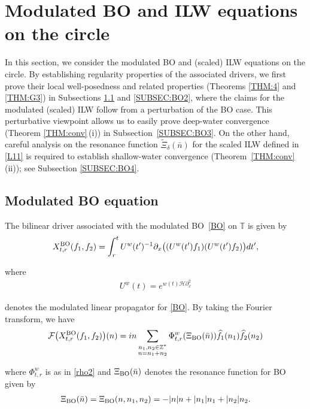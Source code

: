 \documentclass[letterpaper, 11pt,  reqno]{amsart}
\newcommand{\1}{\hspace{0.5mm}\text{I}\hspace{0.5mm}}
\newcommand{\noi}{\noindent}
\newcommand{\Z}{\mathbb{Z}}
\newcommand{\T}{\mathbb{T}}
\renewcommand{\H}{\mathcal{H}}
\newcommand{\F}{\mathcal{F}}
\newcommand{\dl}{\delta}
\newcommand{\ft}{\widehat}
\newcommand{\wt}{\widetilde}
\newcommand{\dx}{\partial_x}
\newcommand{\uw}{U^w}
\newcommand{\sub}{\substack}
\newcommand{\BO}{\text{\rm BO} }
\numberwithin{equation}{section}
\numberwithin{theorem}{section}
\begin{document}
\section{Modulated BO and ILW equations on the circle}
\label{SEC:BO}




In this section, we consider the
modulated BO  and (scaled) ILW  equations
on the circle.
By establishing regularity properties
of the associated drivers, we first prove 
their local well-posedness and related properties
(Theorems \ref{THM:4} and \ref{THM:G3})
in Subsections \ref{SUBSEC:BO1} and
 \ref{SUBSEC:BO2}, 
 where the claims for the modulated (scaled) ILW follow
 from a perturbation of the BO case.
This perturbative viewpoint
allows us to 
easily prove
deep-water convergence (Theorem \ref{THM:conv}\,(i)) in Subsection~\ref{SUBSEC:BO3}.
On the other hand, 
 careful analysis
on the resonance function $\wt \Xi_\dl(\bar n)$ 
for the scaled ILW defined in \eqref{L11}
is required to establish
shallow-water convergence
(Theorem~\ref{THM:conv}\,(ii)); 
see  Subsection  \ref{SUBSEC:BO4}.






\subsection{Modulated BO equation}
\label{SUBSEC:BO1}

The bilinear driver associated with 
the modulated BO~\eqref{BO} on $\T$ is given by 
\begin{align}
X^\BO_{t,r}( f _1, f _2)
=\int_r^t  \uw  (t')^{-1}
\dx \big( (\uw (t')   f _1)( \uw (t')  f_2)\big) dt',
\label{B1}
\end{align}


\noi
where 
\begin{align}
\uw (t)=e^{w(t) \H\dx^2 }
\label{B1a}
\end{align}

\noi
denotes 
the modulated linear propagator
for \eqref{BO}.
By taking the Fourier transform, we have 
\begin{align}
\F\big( X^\BO_{t,r}  ( f _1, f _2) \big)(n)  =
in  \sum_{ \sub {n_1, n_2 \in \Z^*\\ n = n_1+n_2}}
 \Phi_{t,r}^{w}(\Xi_\BO (\bar n))\ft  f_1 ( n_1 )  \ft   f_2 (n_2)
\label{B2}
\end{align}


\noi
where $\Phi_{t,r}^w$ is as in  \eqref{rho2}
and 
$\Xi_\BO (\bar n)$ denotes the resonance function for BO given by 
\begin{align}
\Xi_\BO (\bar n)
= \Xi_\BO(n,n_1,n_2) = - |n| n +  | n_1 |n_1 +  |n_2| n_2.
\label{B3}
\end{align}
\end{document}
